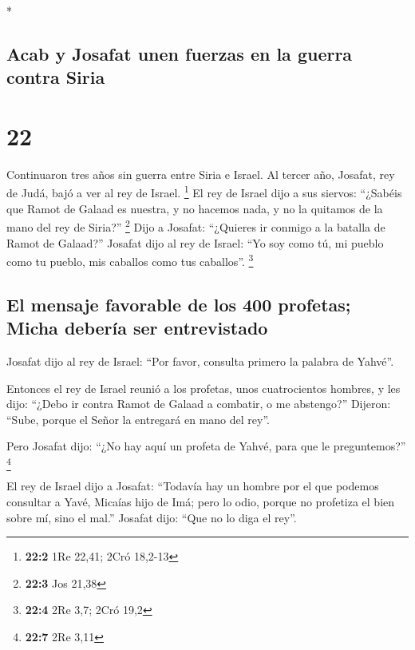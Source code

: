 \begin{paracol}{2}
\begin{otherlanguage}{english}
\end{otherlanguage}

\switchcolumn[0]*

\hypertarget{acab-y-josafat-unen-fuerzas-en-la-guerra-contra-siria}{%
\subsection{Acab y Josafat unen fuerzas en la guerra contra
Siria}\label{acab-y-josafat-unen-fuerzas-en-la-guerra-contra-siria}}

\hypertarget{section-42}{%
\section{22}\label{section-42}}

 Continuaron tres años sin guerra entre Siria e Israel.
 Al tercer año, Josafat, rey de Judá, bajó a ver al rey de
Israel. \footnote{\textbf{22:2} 1Re 22,41; 2Cró 18,2-13} 
El rey de Israel dijo a sus siervos: ``¿Sabéis que Ramot de Galaad es
nuestra, y no hacemos nada, y no la quitamos de la mano del rey de
Siria?'' \footnote{\textbf{22:3} Jos 21,38}  Dijo a
Josafat: ``¿Quieres ir conmigo a la batalla de Ramot de Galaad?''
Josafat dijo al rey de Israel: ``Yo soy como tú, mi pueblo como tu
pueblo, mis caballos como tus caballos''. \footnote{\textbf{22:4} 2Re
  3,7; 2Cró 19,2}

\hypertarget{el-mensaje-favorable-de-los-400-profetas-micha-deberuxeda-ser-entrevistado}{%
\subsection{El mensaje favorable de los 400 profetas; Micha debería ser
entrevistado}\label{el-mensaje-favorable-de-los-400-profetas-micha-deberuxeda-ser-entrevistado}}

 Josafat dijo al rey de Israel: ``Por favor, consulta
primero la palabra de Yahvé''.

 Entonces el rey de Israel reunió a los profetas, unos
cuatrocientos hombres, y les dijo: ``¿Debo ir contra Ramot de Galaad a
combatir, o me abstengo?'' Dijeron: ``Sube, porque el Señor la entregará
en mano del rey''.

 Pero Josafat dijo: ``¿No hay aquí un profeta de Yahvé,
para que le preguntemos?'' \footnote{\textbf{22:7} 2Re 3,11}

 El rey de Israel dijo a Josafat: ``Todavía hay un hombre
por el que podemos consultar a Yavé, Micaías hijo de Imá; pero lo odio,
porque no profetiza el bien sobre mí, sino el mal.'' Josafat dijo: ``Que
no lo diga el rey''.


\end{paracol}
